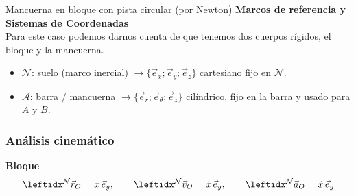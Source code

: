 \begin{solucion}{Mancuerna en bloque con pista circular (por Newton)}
\textbf{Marcos de referencia y Sistemas de Coordenadas}\\
Para este caso podemos darnos cuenta de que tenemos dos cuerpos rígidos, el bloque y la mancuerna.
\begin{itemize}
    \item $\mathcal{N}$: suelo (marco inercial) $\longrightarrow\{\vec{e}_x;\vec{e}_y;\vec{e}_z\}$ cartesiano fijo en $\mathcal{N}$.
    \item $\mathcal{A}$: barra / mancuerna $\longrightarrow\{\vec{e}_r;\vec{e}_\theta;\vec{e}_z\}$ cilíndrico, fijo en la barra y usado para $A$ y $B$.
\end{itemize}

\begin{center}
\end{center}

\subsubsection*{Análisis cinemático}
\textbf{Bloque}
$$\marc{\vec{r}_O}{N}{} = x\,\vec{e}_y, \qquad
\marc{\vec{v}_O}{N}{} = \dot{x}\,\vec{e}_y, \qquad
\marc{\vec{a}_O}{N}{} = \ddot{x}\,\vec{e}_y$$


\end{solucion}
